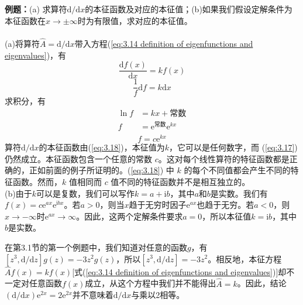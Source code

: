 	\begin{examplebox}
		\textbf{例题：}(a) 求算符$\mathrm{d}/\mathrm{d}x$的本征函数及对应的本征值；(b)如果我们假设定解条件为本征函数在$x \to \pm \infty$时为有限值，求对应的本征值。\\
		\\
		(a)将算符$\hat{A} = \mathrm{d}/\mathrm{d}x$带入方程(\ref{eq:3.14 definition of eigenfunctions and eigenvalues})，有
		\begin{equation}
			\frac{\mathrm{d}f\left(x\right)}{\mathrm{d}x} = kf\left(x\right)
			\label{eq:3.17}
		\end{equation}
		\begin{equation*}
			\frac{1}{f}\mathrm{d}f = k \mathrm{d}x
		\end{equation*}
		求积分，有
		\begin{equation*}
			\begin{aligned}
				\ln f & = kx + \text{常数} \\
				f & = \mathrm{e}^{\text{常数}}\mathrm{e}^{kx} \\
			\end{aligned}
		\end{equation*}
		\begin{equation}
			f  = c\mathrm{e}^{kx}
			\label{eq:3.18}
		\end{equation}
		算符$\mathrm{d}/\mathrm{d}x$的本征函数由(\ref{eq:3.18})，本征值为$k$，它可以是任何数字，而 (\ref{eq:3.17}) 仍然成立。本征函数包含一个任意的常数 $c$。这对每个线性算符的特征函数都是正确的，正如前面的例子所证明的。(\ref{eq:3.18}) 中 $k$ 的每个不同值都会产生不同的特征函数。然而，$k$ 值相同而 $c$ 值不同的特征函数并不是相互独立的。\\
		(b)由于$k$可以是复数，我们可以写作$k = a+\mathrm{i}b$，其中$a$和$b$是实数。我们有$f\left(x\right) = c\mathrm{e}^{ax}\mathrm{e}^{\mathrm{i}bx}$。若$a>0$，则当$x$趋于无穷时因子$\mathrm{e}^{ax}$也趋于无穷。若$a<0$，则$x \to - \infty$时$\mathrm{e}^{ax} \to \infty$。因此，这两个定解条件要求$a=0$，所以本征值$k=\mathrm{i}b$，其中$b$是实数。
	\end{examplebox}
	\indent 在第3.1节的第一个例题中，我们知道对任意的函数$g$，有$\left[z^3,\mathrm{d}/\mathrm{d}z\right]g\left(z\right) = -3z^2g\left(z\right)$，所以$\left[z^3,\mathrm{d}/\mathrm{d}z\right] = -3z^2$。相反地，本征方程$\hat{A}f\left(x\right) = kf\left(x\right)$[式(\ref{eq:3.14 definition of eigenfunctions and eigenvalues})]却不一定对任意函数$f\left(x\right)$成立，从这个方程中我们并不能得出$\hat{A}=k$。因此，结论$\left(\mathrm{d}/\mathrm{d}x\right)\mathrm{e}^{2x} = 2\mathrm{e}^{2x}$并不意味着$\mathrm{d}/\mathrm{d}x$与乘以2相等。
	
